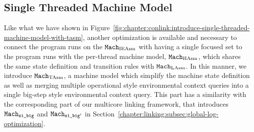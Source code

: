 \subsection{Single Threaded Machine Model}
\label{chapter:linking:subsec:single-threaded-machine-model}

Like what we have shown in Figure~\ref{fig:chapter:conlink:introduce-single-threaded-machine-model-with-tasm}, 
another optimization is available and necessary 
to connect the program runs on the ${\mathrm{\texttt{Mach}}}_{\mathrm{IEAsm}}$ with having a single focused set to
the program runs with the per-thread machine model, ${\mathrm{\texttt{Mach}}}_{\mathrm{HAsm}}$, which shares the 
same state definition and transition rules with ${\mathrm{\texttt{Mach}}}_{\mathrm{LAsm}}$. 
In this manner,
we introduce ${\mathrm{\texttt{Mach}}}_{\mathrm{TAsm}}$, a machine model
which simplify the machine state definition as  well as
merging multiple operational style environmental context queries into a single big-step style 
environmental context query.  
This part has a similarity with the corresponding part of our multicore linking framework, 
that introduces ${{{\mathrm{\texttt{Mach}}}}_{{\mathrm{\texttt{si\_big}}}}}$ and ${{{\mathrm{\texttt{Mach}}}}_{{\mathrm{\texttt{si\_big}}}'}}$ in Section~\ref{chapter:linking:subsec:global-log-optimization}.



%
%
%


